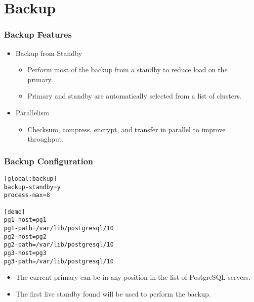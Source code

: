 \section{Backup}

\begin{frame}
    \frametitle{Backup Features}

    \begin{itemize}
        \item Backup from Standby

        \begin{itemize}
            \item Perform most of the backup from a standby to reduce load on the primary.\pause
            \item Primary and standby are automatically selected from a list of clusters.\pause
        \end{itemize}

        \item Parallelism

        \begin{itemize}
            \item Checksum, compress, encrypt, and transfer in parallel to improve throughput.
        \end{itemize}
    \end{itemize}
\end{frame}

\begin{frame}[fragile]
    \frametitle{Backup Configuration}

    \vspace{.75em}\begin{lstlisting}[title=pgbackrest.conf]
[global:backup]
backup-standby=y
process-max=8

[demo]
pg1-host=pg1
pg1-path=/var/lib/postgresql/10
pg2-host=pg2
pg2-path=/var/lib/postgresql/10
pg3-host=pg3
pg3-path=/var/lib/postgresql/10
    \end{lstlisting}\pause\vspace{1em}

    \begin{itemize}
        \item The current primary can be in any position in the list of PostgreSQL servers.\pause
        \item The first live standby found will be used to perform the backup.
    \end{itemize}
\end{frame}

